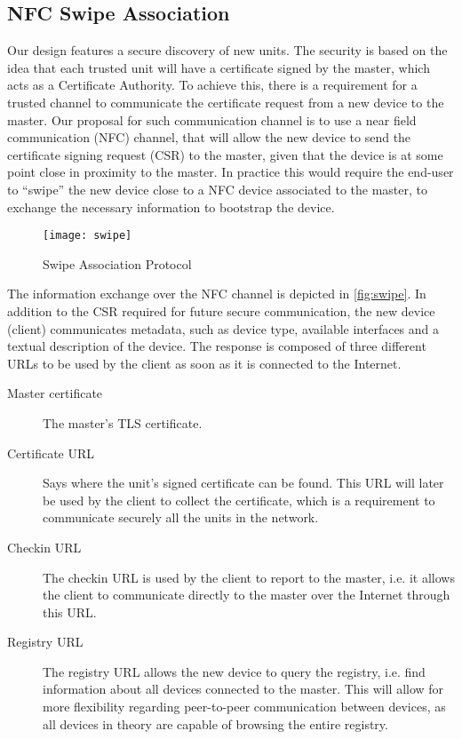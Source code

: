 \subsection{NFC Swipe Association}
Our design features a secure discovery of new units. The security is based on the idea that each trusted unit will have a certificate signed by the master, which acts as a Certificate Authority. To achieve this, there is a requirement for a trusted channel to communicate the certificate request from a new device to the master. Our proposal for such communication channel is to use a near field communication (NFC) channel, that will allow the new device to send the certificate signing request (CSR) to the master, given that the device is at some point close in proximity to the master. In practice this would require the end-user to “swipe” the new device close to a NFC device associated to the master, to exchange the necessary information to bootstrap the device.

\begin{figure}[ht]
    \centering
    \texttt{[image: swipe]}\label{fig:swipe}
    \caption{Swipe Association Protocol}
\end{figure}

The information exchange over the NFC channel is depicted in \autoref{fig:swipe}. In addition to the CSR required for future secure communication, the new device (client) communicates metadata, such as device type, available interfaces and a textual description of the device. The response is composed of three different URLs to be used by the client as soon as it is connected to the Internet.

\begin{description}
\item[Master certificate]
    The master's TLS certificate.
\item[Certificate URL]
    Says where the unit's signed certificate can be found. This URL will later be used by the client to collect the certificate, which is a requirement to communicate securely all the units in the network.
\item[Checkin URL]
    The checkin URL is used by the client to report to the master, i.e. it allows the client to communicate directly to the master over the Internet through this URL.
\item[Registry URL]
    The registry URL allows the new device to query the registry, i.e. find information about all devices connected to the master. This will allow for more flexibility regarding peer-to-peer communication between devices, as all devices in theory are capable of browsing the entire registry.
\end{description}

